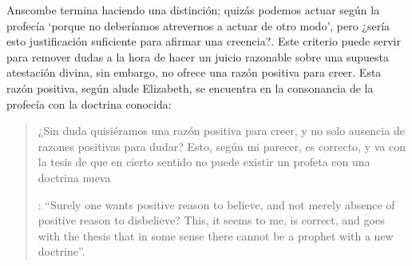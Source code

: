 Anscombe termina haciendo una distinción; quizás podemos actuar según la profecía \enquote*{porque no deberíamos atrevernos a actuar de otro modo}, pero ¿sería esto justificación suficiente para afirmar una creencia?. Este criterio puede servir para remover dudas a la hora de hacer un juicio razonable sobre una supuesta atestación divina, sin embargo, no ofrece una razón positiva para creer. Esta razón positiva, según alude Elizabeth, se encuentra en la consonancia de la profecía con la doctrina conocida: \blockquote[{\Cite[39]{anscombe2008faith:prophandmi}}: \enquote{Surely one wants positive reason to believe, and not merely absence of positive reason to disbelieve? This, it seems to me, is correct, and goes with the thesis that in some sense there cannot be a prophet with a new doctrine}.]{¿Sin duda quisiéramos una razón positiva para creer, y no solo ausencia de razones positivas para dudar? Esto, según mi parecer, es correcto, y va con la tesis de que en cierto sentido no puede existir un profeta con una doctrina nueva}.
